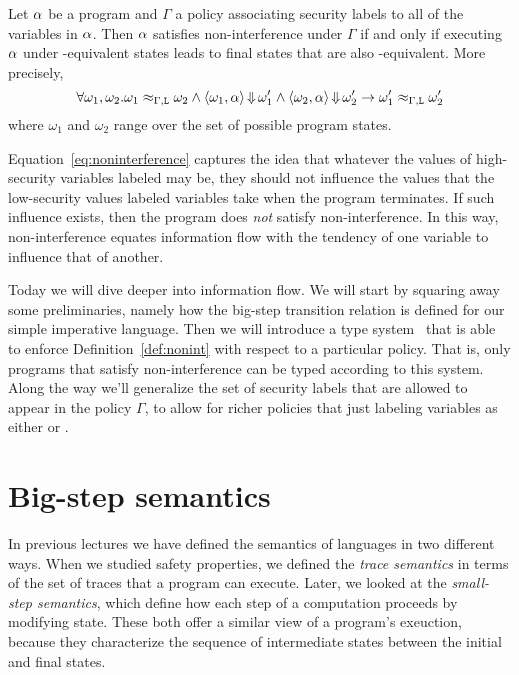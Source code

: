 \documentclass[11pt,twoside]{scrartcl}
\begin{document}
\begin{definition}
\label{def:nonint}
Let $\alpha$ be a program and $\Gamma$ a policy associating security labels to all of the variables in $\alpha$. Then $\alpha$ satisfies non-interference under $\Gamma$ if and only if executing $\alpha$ under \lowsec-equivalent states leads to final states that are also \lowsec-equivalent. More precisely,
\begin{equation}
\label{eq:noninterference}
\forall \omega_1,\omega_2 . \omega_1 \approx_{\Gamma,\lowsec} \omega_2 \land 
\langle \omega_1, \asprg\rangle \bigstep \omega_1' \land 
\langle \omega_2, \asprg\rangle \bigstep \omega_2'
\limply
\omega_1' \approx_{\Gamma,\lowsec} \omega_2'
\end{equation}
where $\omega_1$ and $\omega_2$ range over the set of possible program states.
\end{definition}

Equation~\ref{eq:noninterference} captures the idea that whatever the values of high-security variables labeled \hisec may be, they should not influence the values that the low-security values labeled \lowsec variables take when the program terminates. If such influence exists, then the program does \emph{not} satisfy non-interference. In this way, non-interference equates information flow with the tendency of one variable to influence that of another.

Today we will dive deeper into information flow. We will start by squaring away some preliminaries, namely how the big-step transition relation is defined for our simple imperative language. Then we will introduce a type system~\cite{Volpano1996} that is able to enforce Definition~\ref{def:nonint} with respect to a particular policy. That is, only programs that satisfy non-interference can be typed according to this system. Along the way we'll generalize the set of security labels that are allowed to appear in the policy $\Gamma$, to allow for richer policies that just labeling variables as either \hisec or \lowsec.

\section{Big-step semantics}

In previous lectures we have defined the semantics of languages in two different ways. When we studied safety properties, we defined the \emph{trace semantics} in terms of the set of traces that a program can execute. Later, we looked at the \emph{small-step semantics}, which define how each step of a computation proceeds by modifying state. These both offer a similar view of a program's exeuction, because they characterize the sequence of intermediate states between the initial and final states.
\end{document}
